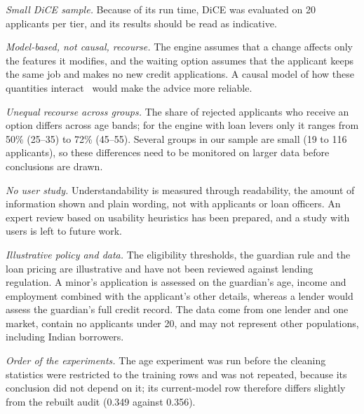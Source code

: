 \emph{Small DiCE sample.} Because of its run time, DiCE was evaluated on 20 applicants per tier, and its results
should be read as indicative.

\emph{Model-based, not causal, recourse.} The engine assumes that a change affects only the features it modifies, and
the waiting option assumes that the applicant keeps the same job and makes no new credit applications. A causal model
of how these quantities interact~\cite{karimi2022survey} would make the advice more reliable.

\emph{Unequal recourse across groups.} The share of rejected applicants who receive an option differs across age
bands; for the engine with loan levers only it ranges from 50\% (25--35) to 72\% (45--55). Several groups in our
sample are small (19 to 116 applicants), so these differences need to be monitored on larger data before conclusions
are drawn.

\emph{No user study.} Understandability is measured through readability, the amount of information shown and plain
wording, not with applicants or loan officers. An expert review based on usability heuristics has been prepared, and a
study with users is left to future work.

\emph{Illustrative policy and data.} The eligibility thresholds, the guardian rule and the loan pricing are
illustrative and have not been reviewed against lending regulation. A minor's application is assessed on the
guardian's age, income and employment combined with the applicant's other details, whereas a lender would assess the
guardian's full credit record. The data come from one lender and one market, contain no applicants under 20, and may
not represent other populations, including Indian borrowers.

\emph{Order of the experiments.} The age experiment was run before the cleaning statistics were restricted to the
training rows and was not repeated, because its conclusion did not depend on it; its current-model row therefore
differs slightly from the rebuilt audit (0.349 against 0.356).
